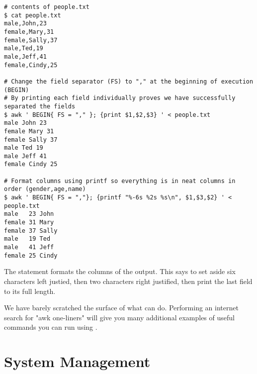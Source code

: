 \begin{lstlisting}
# contents of people.txt
$ cat people.txt
male,John,23
female,Mary,31
female,Sally,37
male,Ted,19
male,Jeff,41
female,Cindy,25

# Change the field separator (FS) to "," at the beginning of execution (BEGIN)
# By printing each field individually proves we have successfully separated the fields
$ awk ' BEGIN{ FS = "," }; {print $1,$2,$3} ' < people.txt
male John 23
female Mary 31
female Sally 37
male Ted 19
male Jeff 41
female Cindy 25

# Format columns using printf so everything is in neat columns in order (gender,age,name)
$ awk ' BEGIN{ FS = ","}; {printf "%-6s %2s %s\n", $1,$3,$2} ' < people.txt
male   23 John
female 31 Mary
female 37 Sally
male   19 Ted
male   41 Jeff
female 25 Cindy
\end{lstlisting}

The statement  formats the columns of the output.
This says to set aside six characters left justied, then two characters right justified, then print the last field to its full length.

\begin{comment}
\begin{problem}
Inside the \texttt{Documents/} directory, you should find a file named \texttt{files.txt}.
This file contains details on approximately one hundred files.
The different fields in the file are separated by tabs.
Using \li{awk}, \li{sort}, pipes, and redirects, write a file named \texttt{date\_modified.txt} with the following specifications:
\begin{itemize}
\item in the first column, print the date the file was modified
\item in the second column, print the name of the file
\item sort the file from newest to oldest based on the date last modified
\end{itemize}
All this can be accomplished using one command.
\end{problem}
\end{comment}

We have barely scratched the surface of what  can do.
Performing an internet search for "awk one-liners" will give you many additional examples of useful commands you can run using .

\section*{System Management} %

